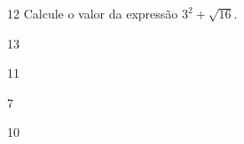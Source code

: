 





\num{12} Calcule o valor da expressão $3^{2} + \sqrt{16}$.

\begin{escolha}
\item 13
\item 11
\item 7
\item 10
\end{escolha}







